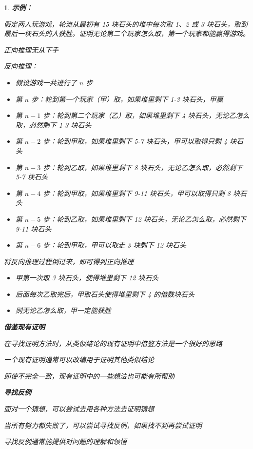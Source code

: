 \documentclass[UTF8]{report}
\theoremstyle{MyLineTheoremStyle} %
\theoremstyle{MyBlockTheoremStyle} %
\theoremstyle{MySubsubsectionStyle} %
\newtheorem{definition}{}
\begin{document}
\begin{definition}
    \textbf{示例：}\par
    假定两人玩游戏，轮流从最初有 15 块石头的堆中每次取 1、2 或 3 块石头，取到最后一块石头的人获胜。证明无论第二个玩家怎么取，第一个玩家都能赢得游戏。\par
    正向推理无从下手\par
    反向推理：\par
    \begin{itemize}
        \item 假设游戏一共进行了 $n$ 步
        \item 第 $n$ 步：轮到第一个玩家（甲）取，如果堆里剩下 1-3 块石头，甲赢
        \item 第 $n - 1$ 步：轮到第二个玩家（乙）取，如果堆里剩下 4 块石头，无论乙怎么取，必然剩下 1-3 块石头
        \item 第 $n - 2$ 步：轮到甲取，如果堆里剩下 5-7 块石头，甲可以取得只剩 4 块石头
        \item 第 $n - 3$ 步：轮到乙取，如果堆里剩下 8 块石头，无论乙怎么取，必然剩下 5-7 块石头
        \item 第 $n - 4$ 步：轮到甲取，如果堆里剩下 9-11 块石头，甲可以取得只剩 8 块石头
        \item 第 $n - 5$ 步：轮到乙取，如果堆里剩下 12 块石头，无论乙怎么取，必然剩下 9-11 块石头
        \item 第 $n - 6$ 步：轮到甲取，甲可以取走 3 块剩下 12 块石头
    \end{itemize}
    将反向推理过程倒过来，即可得到正向推理\par
    \begin{itemize}
        \item 甲第一次取 3 块石头，使得堆里剩下 12 块石头
        \item 后面每次乙取完后，甲取石头使得堆里剩下 4 的倍数块石头
        \item 则无论乙怎么取，甲一定能获胜
    \end{itemize}

    \textbf{借鉴现有证明}\par
    在寻找证明方法时，从类似结论的现有证明中借鉴方法是一个很好的思路\par
    一个现有证明通常可以改编用于证明其他类似结论\par
    即使不完全一致，现有证明中的一些想法也可能有所帮助\par

    \textbf{寻找反例}\par
    面对一个猜想，可以尝试去用各种方法去证明猜想\par
    当所有努力都失败了，可以尝试寻找反例，如果找不到再尝试证明\par
    寻找反例通常能提供对问题的理解和领悟\par
\end{definition}
\end{document}
